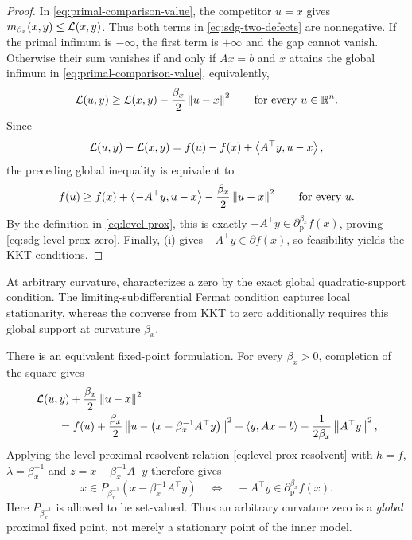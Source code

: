 \begin{proof}
  In \cref{eq:primal-comparison-value}, the competitor \(u=x\) gives
  \(m_{\beta_x}(x,y)\le\mathcal{L}(x,y)\).  Thus both terms in
  \cref{eq:sdg-two-defects} are nonnegative.  If the primal infimum is
  \(-\infty\), the first term is \(+\infty\) and the gap cannot vanish.
  Otherwise their sum vanishes if and only if \(Ax=b\) and \(x\) attains the
  global infimum in \cref{eq:primal-comparison-value}, equivalently,
  \[
    \mathcal{L}(u,y)
      \ge
    \mathcal{L}(x,y)-\frac{\beta_x}{2}\left\lVert u-x\right\rVert^2
    \qquad\text{for every }u\in\mathbb{R}^n.
  \]
  Since
  \[
    \mathcal{L}(u,y)-\mathcal{L}(x,y)
    =
    f(u)-f(x)+\left\langle A^\top y,u-x\right\rangle,
  \]
  the preceding global inequality is equivalent to
  \[
    f(u)\ge f(x)+\left\langle -A^\top y,u-x\right\rangle
      -\frac{\beta_x}{2}\left\lVert u-x\right\rVert^2
    \qquad\text{for every }u.
  \]
  By the definition in \cref{eq:level-prox}, this is exactly
  \(-A^\top y\in\partial_{\mathrm p}^{\beta_x}f(x)\), proving
  \cref{eq:sdg-level-prox-zero}.  Finally,
  (i) gives
  \(-A^\top y\in\partial f(x)\), so feasibility yields the KKT conditions.
\end{proof}

At arbitrary curvature,  characterizes a zero by
the exact global quadratic-support condition.  The limiting-subdifferential
Fermat condition captures local stationarity, whereas the converse from KKT
to zero additionally requires this global support at curvature
\(\beta_x\).

There is an equivalent fixed-point formulation.  For every \(\beta_x>0\),
completion of the square gives
\begin{equation}
  \begin{split}
  &\mathcal{L}(u,y)+\frac{\beta_x}{2}\left\lVert u-x\right\rVert^2\\
  &\qquad =
  f(u)
  +\frac{\beta_x}{2}
     \left\lVert u-\left(x-\beta_x^{-1}A^\top y\right)\right\rVert^2
  +\left\langle y,Ax-b\right\rangle
  -\frac{1}{2\beta_x}\left\lVert A^\top y\right\rVert^2 ,
  \end{split}
  \label{eq:lagrangian-completing-square-expanded}
\end{equation}
Applying the level-proximal resolvent relation
\cref{eq:level-prox-resolvent} with \(h=f\),
\(\lambda=\beta_x^{-1}\) and
\(z=x-\beta_x^{-1}A^\top y\) therefore gives
\begin{equation}
  x\in
  P_{\beta_x^{-1}}
    \left(x-\beta_x^{-1}A^\top y\right)
  \quad\Longleftrightarrow\quad
  -A^\top y\in\partial_{\mathrm p}^{\beta_x}f(x).
  \label{eq:sdg-global-fixed-point}
\end{equation}
Here \(P_{\beta_x^{-1}}\) is allowed to be set-valued.  Thus an arbitrary
curvature zero is a \emph{global} proximal fixed point, not merely a
stationary point of the inner model.

